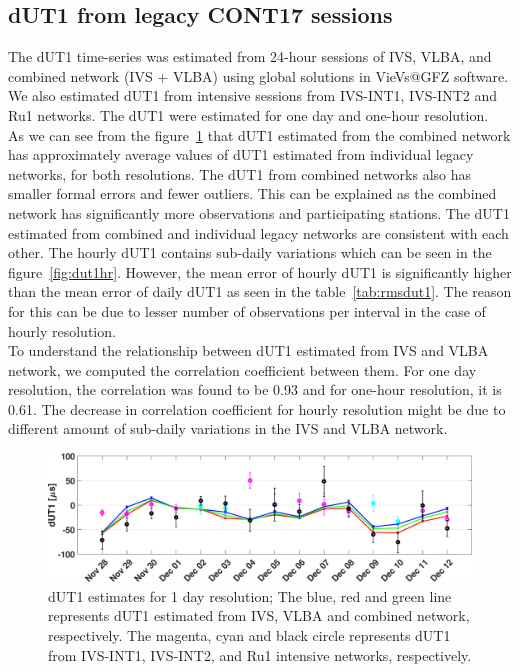 \documentclass[smallextended]{svjour3}       %
\begin{document}
\subsection{dUT1 from legacy CONT17 sessions}
The dUT1 time-series was estimated from 24-hour sessions of IVS, VLBA, and combined network (IVS + VLBA) using global solutions in VieVs@GFZ software. We also estimated dUT1 from intensive sessions from IVS-INT1, IVS-INT2 and Ru1 networks. The dUT1 were estimated for one day and one-hour resolution. \\
As we can see from the figure~\ref{fig:dut1d} that dUT1 estimated from the combined network has approximately average values of dUT1 estimated from individual legacy networks, for both resolutions. The dUT1 from combined networks also has smaller formal errors and fewer outliers. This can be explained as the combined network has significantly more observations and participating stations. The dUT1 estimated from combined and individual legacy networks are consistent with each other. The hourly dUT1 contains sub-daily variations which can be seen in the figure~\ref{fig:dut1hr}. However, the mean error of hourly dUT1 is significantly higher than the mean error of daily dUT1 as seen in the table~\ref{tab:rmsdut1}. The reason for this can be due to lesser number of observations per interval in the case of hourly resolution. \\
To understand the relationship between dUT1 estimated from IVS and VLBA network, we computed the correlation coefficient between them. For one day resolution, the correlation was found to be 0.93 and for one-hour resolution, it is 0.61. The decrease in correlation coefficient for hourly resolution might be due to different amount of sub-daily variations in the IVS and VLBA network. \\
\begin{figure}[h]
    \centering
    \includegraphics[scale=0.3]{dut11dayint.eps}
    \caption{dUT1 estimates for 1 day resolution; The blue, red and green line represents dUT1 estimated from IVS, VLBA and combined network, respectively. The magenta, cyan and black circle represents dUT1 from IVS-INT1, IVS-INT2, and Ru1 intensive networks, respectively.}
    \label{fig:dut1d}
\end{figure}
\end{document}
